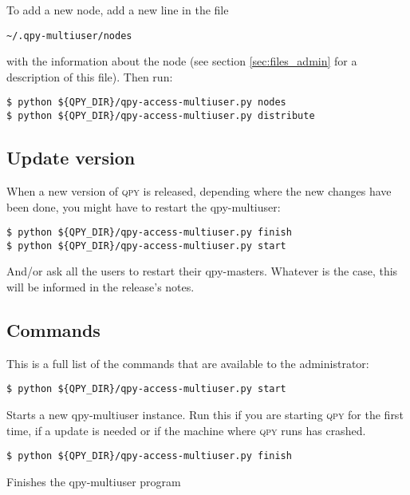 \documentclass[a4paper,12pt]{article}
\newcommand{\qpy}{\textsc{qpy}}
\begin{document}
To add a new node, add a new line in the file

\begin{verbatim}
~/.qpy-multiuser/nodes
\end{verbatim}

with the information about the node (see section \ref{sec:files_admin} for a description of this file).
Then run:

\begin{verbatim}
$ python ${QPY_DIR}/qpy-access-multiuser.py nodes
$ python ${QPY_DIR}/qpy-access-multiuser.py distribute
\end{verbatim}




\subsection{Update version}

When a new version of \qpy{} is released, depending where the new changes have been done, you might have to restart the qpy-multiuser:

\begin{verbatim}
$ python ${QPY_DIR}/qpy-access-multiuser.py finish
$ python ${QPY_DIR}/qpy-access-multiuser.py start
\end{verbatim}

And/or ask all the users to restart their qpy-masters.
Whatever is the case, this will be informed in the release's notes.



\subsection{Commands}

This is a full list of the commands that are available to the administrator:

\begin{lstlisting}[style=BashStyle]
$ python ${QPY_DIR}/qpy-access-multiuser.py start
\end{lstlisting}

Starts a new qpy-multiuser instance.
Run this if you are starting \qpy{} for the first time, if a update is needed or if the machine where \qpy{} runs has crashed.

\begin{lstlisting}[style=BashStyle]
$ python ${QPY_DIR}/qpy-access-multiuser.py finish
\end{lstlisting}

Finishes the qpy-multiuser program
\end{document}
